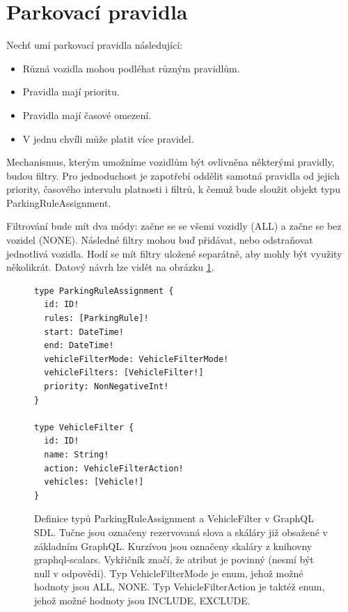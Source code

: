 \newpage
\section{Parkovací pravidla} \label{analysis_parking_schema}

\noindent
Nechť umí parkovací pravidla následující:

\begin{itemize}
  \setlength\itemsep{.05em}
  \item Různá vozidla mohou podléhat různým pravidlům.
  \item Pravidla mají prioritu.
  \item Pravidla mají časové omezení.
  \item V jednu chvíli může platit více pravidel.
\end{itemize}

\noindent
Mechanismus, kterým umožníme vozidlům být ovlivněna některými pravidly,
budou filtry.
Pro jednoduchost je zapotřebí oddělit samotná pravidla od jejich
priority, časového intervalu platnosti i filtrů,
k čemuž bude sloužit objekt typu ParkingRuleAssignment.

Filtrování bude mít dva módy: začne se se všemi vozidly (ALL) a začne se bez vozidel (NONE).
Následné filtry mohou buď přidávat, nebo odstraňovat jednotlivá vozidla.
Hodí se mít filtry uložené separátně, aby mohly být využity několikrát.
Datový návrh lze vidět na obrázku \ref{fig:type_pra_vf}.

\begin{figure}[!htb]
\lstset{language=GraphQL}
\begin{lstlisting}
type ParkingRuleAssignment {
  id: ID!
  rules: [ParkingRule]!
  start: DateTime!
  end: DateTime!
  vehicleFilterMode: VehicleFilterMode!
  vehicleFilters: [VehicleFilter!]
  priority: NonNegativeInt!
}

type VehicleFilter {
  id: ID!
  name: String!
  action: VehicleFilterAction!
  vehicles: [Vehicle!]
}
\end{lstlisting}
\caption[Definice typů ParkingRuleAssignment a VehicleFilter v GraphQL SDL.]{Definice typů ParkingRuleAssignment a VehicleFilter v GraphQL SDL.
Tučne jsou označeny rezervovaná slova a skáláry již obsažené v základním GraphQL.
Kurzívou jsou označeny skaláry z knihovny graphql-scalars.
Vykřičník značí, že atribut je povinný (nesmí být null v odpovědi).
Typ VehicleFilterMode je enum, jehož možné hodnoty jsou ALL, NONE.
Typ VehicleFilterAction je taktéž enum, jehož možné hodnoty jsou INCLUDE, EXCLUDE.}
\label{fig:type_pra_vf}
\end{figure}

